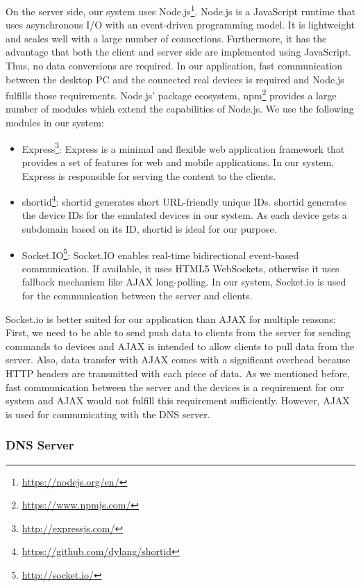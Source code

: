 On the server side, our system uses Node.js\footnote{\url{https://nodejs.org/en/}}. Node.js is a JavaScript runtime that uses asynchronous I/O with an event-driven programming model. It is lightweight and scales well with a large number of connections. Furthermore, it has the advantage that both the client and server side are implemented using JavaScript. Thus, no data conversions are required. In our application, fast communication between the desktop PC and the connected real devices is required and Node.js fulfills those requirements. Node.js' package ecosystem, npm\footnote{\url{https://www.npmjs.com/}} provides a large number of modules which extend the capabilities of Node.js. We use the following modules in our system: 
\begin{itemize}
	\item Express\footnote{\url{http://expressjs.com/}}: Express is a minimal and flexible web application framework that provides a set of features for web and mobile applications. In our system, Express is responsible for serving the content to the clients.
	\item shortid\footnote{\url{https://github.com/dylang/shortid}}: shortid generates short URL-friendly unique IDs. shortid generates the device IDs for the emulated devices in our system. As each device gets a subdomain based on its ID, shortid is ideal for our purpose.
	\item Socket.IO\footnote{\url{http://socket.io/}}: Socket.IO enables real-time bidirectional event-based communication. If available, it uses HTML5 WebSockets, otherwise it uses fallback mechanism like AJAX long-polling. In our system, Socket.io is used for the communication between the server and clients.
\end{itemize}

Socket.io is better suited for our application than AJAX for multiple reasons: First, we need to be able to send push data to clients from the server for sending commands to devices and AJAX is intended to allow clients to pull data from the server. Also, data transfer with AJAX comes with a significant overhead because HTTP headers are transmitted with each piece of data. As we mentioned before, fast communication between the server and the devices is a requirement for our system and AJAX would not fulfill this requirement sufficiently. However, AJAX is used for communicating with the DNS server.

\subsubsection{DNS Server}

